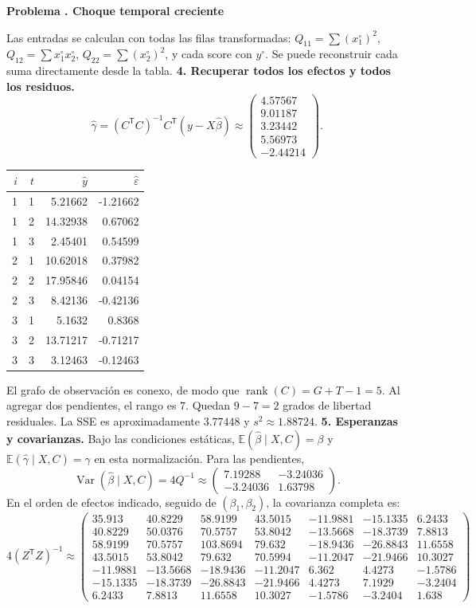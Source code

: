\documentclass[11pt,a4paper]{article}
\newcommand{\E}{\mathbb E}
\newcommand{\T}{^{\mathsf T}}
\DeclareMathOperator{\Var}{Var}
\DeclareMathOperator{\rank}{rank}
\theoremstyle{definition}
\newcounter{problema}
\newenvironment{resuelto}[1]{\refstepcounter{problema}\par\medskip\Needspace{6\baselineskip}\textbf{Problema \theproblema. #1}\par}{\par\medskip}
\newcommand{\eps}{\varepsilon}
\begin{document}
\begin{resuelto}{Choque temporal creciente}
\[\]
Las entradas se calculan con todas las filas transformadas: $Q_{11}=\sum (x_1^\circ)^2$, $Q_{12}=\sum x_1^\circ x_2^\circ$, $Q_{22}=\sum (x_2^\circ)^2$, y cada score con $y^\circ$. Se puede reconstruir cada suma directamente desde la tabla.
\textbf{4. Recuperar todos los efectos y todos los residuos.}
\[
\widehat\gamma=(C\T C)^{-1}C\T(y-X\widehat\beta)\approx\begin{pmatrix}
4.57567\\9.01187\\3.23442\\5.56973\\-2.44214
\end{pmatrix}.
\]

\begin{center}\small
\begin{tabular}{rrrr}
\toprule
$i$&$t$&$\widehat y$&$\widehat\eps$\\
\midrule
1&1&5.21662&-1.21662\\
1&2&14.32938&0.67062\\
1&3&2.45401&0.54599\\
2&1&10.62018&0.37982\\
2&2&17.95846&0.04154\\
2&3&8.42136&-0.42136\\
3&1&5.1632&0.8368\\
3&2&13.71217&-0.71217\\
3&3&3.12463&-0.12463\\
\bottomrule
\end{tabular}
\end{center}
El grafo de observación es conexo, de modo que $\rank(C)=G+T-1=5$. Al agregar dos pendientes, el rango es $7$. Quedan $9-7=2$ grados de libertad residuales. La SSE es aproximadamente $3.77448$ y $s^2\approx1.88724$.
\textbf{5. Esperanzas y covarianzas.} Bajo las condiciones estáticas, $\E(\widehat\beta\mid X,C)=\beta$ y $\E(\widehat\gamma\mid X,C)=\gamma$ en esta normalización. Para las pendientes,
\[
\Var(\widehat\beta\mid X,C)=4Q^{-1}\approx\begin{pmatrix}
7.19288&-3.24036\\-3.24036&1.63798
\end{pmatrix}.
\]
En el orden de efectos indicado, seguido de $(\beta_1,\beta_2)$, la covarianza completa es:
{\small
\[
4(Z\T Z)^{-1}\approx\begin{pmatrix}
35.913&40.8229&58.9199&43.5015&-11.9881&-15.1335&6.2433\\40.8229&50.0376&70.5757&53.8042&-13.5668&-18.3739&7.8813\\58.9199&70.5757&103.8694&79.632&-18.9436&-26.8843&11.6558\\43.5015&53.8042&79.632&70.5994&-11.2047&-21.9466&10.3027\\-11.9881&-13.5668&-18.9436&-11.2047&6.362&4.4273&-1.5786\\-15.1335&-18.3739&-26.8843&-21.9466&4.4273&7.1929&-3.2404\\6.2433&7.8813&11.6558&10.3027&-1.5786&-3.2404&1.638

\end{pmatrix}\]}
\end{resuelto}
\end{document}
